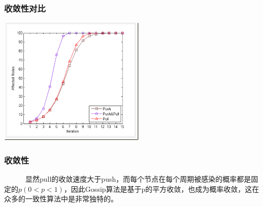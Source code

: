 \documentclass[slidestop,compress,mathserif,c]{beamer}
\begin{document}
\begin{frame}
\frametitle{收敛性对比}
\begin{center}
\includegraphics[width=7cm]{pushpullrat.png} 
\end{center}
\end{frame}





\begin{frame}
\frametitle{收敛性}
 ~~~~~~显然pull的收敛速度大于push，而每个节点在每个周期被感染的概率都是固定的$p(0<p<1)$，因此Gossip算法是基于p的平方收敛，也成为概率收敛，这在众多的一致性算法中是非常独特的。
\end{frame}
\end{document}
